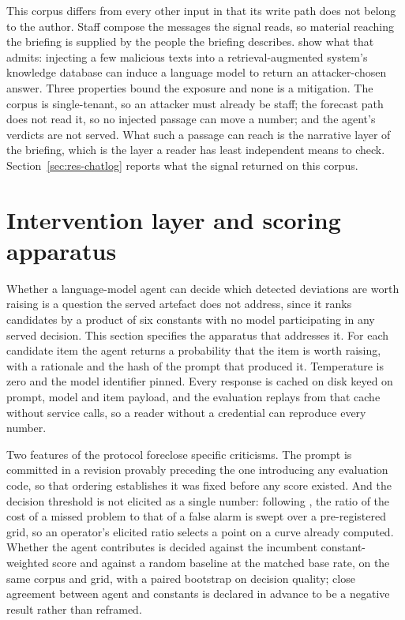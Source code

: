 This corpus differs from every other input in that its write path does not belong to the author.
Staff compose the messages the signal reads, so material reaching the briefing is supplied by the
people the briefing describes. \citet{zou_poisonedrag_2025} show what that admits: injecting a few
malicious texts into a retrieval-augmented system's knowledge database can induce a language model
to return an attacker-chosen answer. Three properties bound the exposure and none is a mitigation.
The corpus is single-tenant, so an attacker must already be staff; the forecast path does not read
it, so no injected passage can move a number; and the agent's verdicts are not served. What such a
passage can reach is the narrative layer of the briefing, which is the layer a reader has least
independent means to check. Section~\ref{sec:res-chatlog} reports what the signal returned on
this corpus.

\section{Intervention layer and scoring apparatus}
\label{sec:agent}

Whether a language-model agent can decide which detected deviations are worth raising is a
question the served artefact does not address, since it ranks candidates by a product of six
constants with no model participating in any served decision. This section specifies the
apparatus that addresses it. For each candidate item the agent returns a probability that the item
is worth raising, with a rationale and the hash of the prompt that produced it. Temperature is
zero and the model identifier pinned. Every response is cached on disk keyed on prompt, model and
item payload, and the evaluation replays from that cache without service calls, so a reader
without a credential can reproduce every number.

Two features of the protocol foreclose specific criticisms. The prompt is committed in a revision
provably preceding the one introducing any evaluation code, so that ordering establishes it was
fixed before any score existed. And the decision threshold is not elicited as a single number:
following \citet{fu_prism_2026}, the ratio of the cost of a missed problem to that of a false
alarm is swept over a pre-registered grid, so an operator's elicited ratio selects a point on a
curve already computed. Whether the agent contributes is decided against the incumbent
constant-weighted score and against a random baseline at the matched base rate, on the same corpus
and grid, with a paired bootstrap on decision quality; close agreement between agent and constants
is declared in advance to be a negative result rather than reframed.


